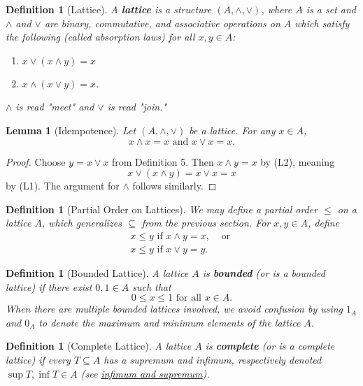 \documentclass{article}
\newtheorem{lemma}[proposition]{Lemma}
\newtheorem{definition}[proposition]{Definition}
\numberwithin{equation}{section}
\newcommand{\meet}{\wedge}
\newcommand{\join}{\vee}
\begin{document}
\begin{definition}[Lattice]

A \textbf{lattice} is a structure $(A, \meet, \join)$, where $A$ is a set and $\meet$ and $\join$ are binary, commutative, and associative operations on $A$ which satisfy the following (called absorption laws) for all $x, y \in A$:

\begin{enumerate}
    \item[L1.]{$x \join (x \meet y) = x$}
    \item[L2.]{$x \meet (x \join y) = x$.}
\end{enumerate}

$\meet$ is read "meet" and $\join$ is read "join."

\end{definition}

\begin{lemma}[Idempotence]
Let $(A, \meet, \join)$ be a lattice. For any $x \in A$, $$x \meet x = x \text{ and } x \join x = x.$$
\end{lemma}

\begin{proof}
Choose $y = x \join x$ from Definition 5. Then $x \meet y = x$ by (L2), meaning $$x \join (x \meet y) = x \join x = x$$ by (L1). The argument for $\meet$ follows similarly.
\end{proof}

\begin{definition}[Partial Order on Lattices]
We may define a partial order $\leq$ on a lattice $A$, which generalizes $\subseteq$ from the previous section. For $x, y \in A$, define 
\begin{align*}
    x \leq y \text{ if } x \meet y = x, & \text{ or } \\
    x \leq y \text{ if } x \join y = y.
\end{align*}
\end{definition}

\begin{definition}[Bounded Lattice]
A lattice $A$ is \textbf{bounded} (or is a bounded lattice) if there exist $0, 1 \in A$ such that $$0 \leq x \leq 1 \text{ for all } x \in A.$$ When there are multiple bounded lattices involved, we avoid confusion by using $1_A$ and $0_A$ to denote the maximum and minimum elements of the lattice $A$.
\end{definition}

\begin{definition}[Complete Lattice]
A lattice $A$ is \textbf{complete} (or is a complete lattice) if every $T \subseteq A$ has a supremum and infimum, respectively denoted $\sup T, \inf T \in A$ (see \href{https://en.wikipedia.org/wiki/Infimum_and_supremum}{infimum and supremum}).
\end{definition}
\end{document}
